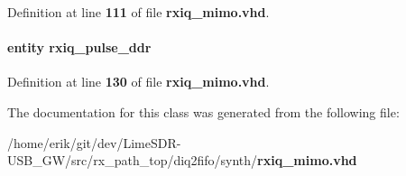 Definition at line {\bf 111} of file {\bf rxiq\+\_\+mimo.\+vhd}.

\paragraph[{rxiq\+\_\+pulse\+\_\+ddr\+\_\+inst1}]{ {\bfseries \textcolor{keywordflow}{entity}\textcolor{vhdlchar}{ }\textcolor{vhdlchar}{rxiq\+\_\+pulse\+\_\+ddr}\textcolor{vhdlchar}{ }} \hspace{0.3cm}{\ttfamily [Instantiation]}}\label{classrxiq__mimo_1_1arch_a6ba6876a2010fd0bd7948dc10c980879}


Definition at line {\bf 130} of file {\bf rxiq\+\_\+mimo.\+vhd}.



The documentation for this class was generated from the following file\+:\begin{DoxyCompactItemize}
\item 
/home/erik/git/dev/\+Lime\+S\+D\+R-\/\+U\+S\+B\+\_\+\+G\+W/src/rx\+\_\+path\+\_\+top/diq2fifo/synth/{\bf rxiq\+\_\+mimo.\+vhd}\end{DoxyCompactItemize}
